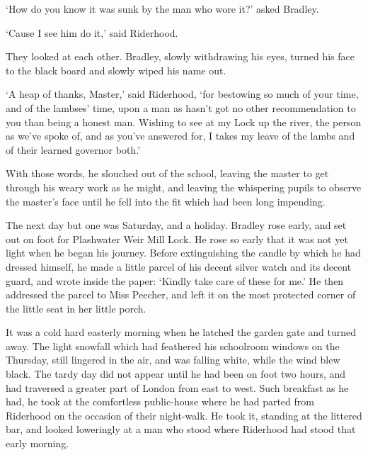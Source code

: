 ‘How do you know it was sunk by the man who wore it?’ asked Bradley.

‘Cause I see him do it,’ said Riderhood.

They looked at each other. Bradley, slowly withdrawing his eyes, turned
his face to the black board and slowly wiped his name out.

‘A heap of thanks, Master,’ said Riderhood, ‘for bestowing so much of
your time, and of the lambses’ time, upon a man as hasn’t got no other
recommendation to you than being a honest man. Wishing to see at my Lock
up the river, the person as we’ve spoke of, and as you’ve answered for,
I takes my leave of the lambs and of their learned governor both.’

With those words, he slouched out of the school, leaving the master
to get through his weary work as he might, and leaving the whispering
pupils to observe the master’s face until he fell into the fit which had
been long impending.

The next day but one was Saturday, and a holiday. Bradley rose early,
and set out on foot for Plashwater Weir Mill Lock. He rose so early that
it was not yet light when he began his journey. Before extinguishing the
candle by which he had dressed himself, he made a little parcel of his
decent silver watch and its decent guard, and wrote inside the paper:
‘Kindly take care of these for me.’ He then addressed the parcel to Miss
Peecher, and left it on the most protected corner of the little seat in
her little porch.

It was a cold hard easterly morning when he latched the garden gate
and turned away. The light snowfall which had feathered his schoolroom
windows on the Thursday, still lingered in the air, and was falling
white, while the wind blew black. The tardy day did not appear until he
had been on foot two hours, and had traversed a greater part of London
from east to west. Such breakfast as he had, he took at the comfortless
public-house where he had parted from Riderhood on the occasion of
their night-walk. He took it, standing at the littered bar, and looked
loweringly at a man who stood where Riderhood had stood that early
morning.

